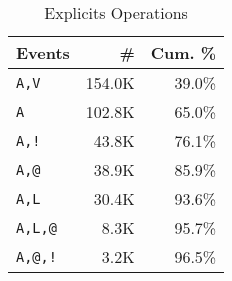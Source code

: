 \documentclass[10pt,sigplan,authorversion=true]{acmart}
\begin{document}
\begin{table}[!h]\small
  \caption{Explicits Operations} \label{table:user_explicit_env_seq}
  \centering
  \begin{tabular}{lrr}    \toprule
    \textbf{Events}&\textbf{\#}&\textbf{Cum. \%}\\
    \midrule
    \texttt{A,V}&154.0K&39.0\%\\
    \texttt{A}&102.8K&65.0\%\\
    \texttt{A,!}&43.8K&76.1\%\\
    \texttt{A,@}&38.9K&85.9\%\\
    \texttt{A,L}&30.4K&93.6\%\\
    \texttt{A,L,@}&8.3K&95.7\%\\
    \texttt{A,@,!}&3.2K&96.5\%\\
    \bottomrule
  \end{tabular}
\end{table}
\end{document}
